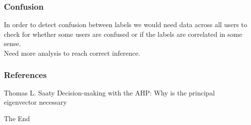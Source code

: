 \documentclass{beamer}
\begin{document}

\begin{frame}
\frametitle{Confusion}
In order to detect confusion between labels we would need data across all users to check for whether some users are confused or if the labels are correlated in some sense. \\
Need more analysis to reach correct inference.
\end{frame}



\begin{frame}
\frametitle{References}
\footnotesize{
\begin{thebibliography}{99} %
 Thomas L. Saaty
\newblock Decision-making with the AHP: Why is the principal eigenvector necessary
\end{thebibliography}
}
\end{frame}


\begin{frame}
\Huge{\centerline{The End}}
\end{frame}

\end{document}
